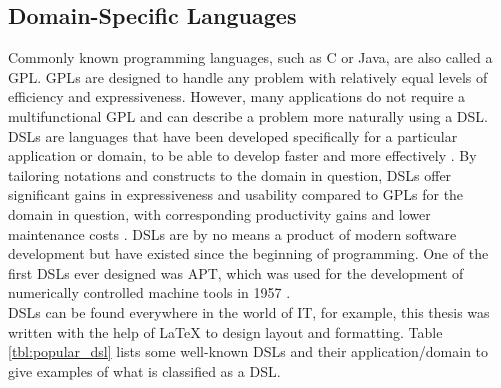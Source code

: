 \subsection{Domain-Specific Languages}\label{sec:dsl}
Commonly known programming languages, such as C or Java, are also called a \ac{GPL}. \ac{GPL}s are designed to handle any problem with relatively equal levels of efficiency and expressiveness. However, many applications do not require a multifunctional \ac{GPL} and can describe a problem more naturally using a \ac{DSL}. \ac{DSL}s are languages that have been developed specifically for a particular application or domain, to be able to develop faster and more effectively \parencite[cf.][p. 1]{hudak_domain-specific_1997}. By tailoring notations and constructs to the domain in question, \ac{DSL}s offer significant gains in expressiveness and usability compared to \ac{GPL}s for the domain in question, with corresponding productivity gains and lower maintenance costs \parencite[cf.][p. 317]{mernik_when_2005}. \ac{DSL}s are by no means a product of modern software development but have existed since the beginning of programming. One of the first \ac{DSL}s ever designed was \ac{APT}, which was used for the development of numerically controlled machine tools in 1957 \parencite[cf.][pp. 283-284]{ross_origins_1978}.\\
\ac{DSL}s can be found everywhere in the world of IT, for example, this thesis was written with the help of \LaTeX{} to design layout and formatting. Table \ref{tbl:popular_dsl} lists some well-known \ac{DSL}s and their application/domain to give examples of what is classified as a \ac{DSL}.
